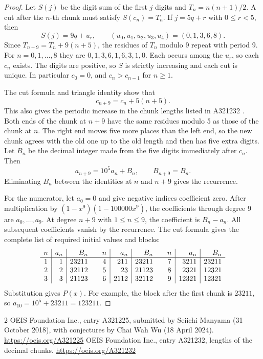 \documentclass[11pt]{article}
\begin{document}
\begin{proof}
Let \(S(j)\) be the digit sum of the first \(j\) digits and \(T_n=n(n+1)/2\). A cut after the \(n\)-th chunk must satisfy \(S(c_n)=T_n\). If \(j=5q+r\) with \(0\le r<5\), then
\[
S(j)=9q+u_r,\qquad (u_0,u_1,u_2,u_3,u_4)=(0,1,3,6,8).
\]
Since \(T_{n+9}=T_n+9(n+5)\), the residues of \(T_n\) modulo 9 repeat with period 9. For \(n=0,1,\ldots,8\) they are \(0,1,3,6,1,6,3,1,0\). Each occurs among the \(u_r\), so each \(c_n\) exists. The digits are positive, so \(S\) is strictly increasing and each cut is unique. In particular \(c_0=0\), and \(c_n>c_{n-1}\) for \(n\ge1\).

The cut formula and triangle identity show that
\[
c_{n+9}=c_n+5(n+5).
\]
This also gives the periodic increase in the chunk lengths listed in A321232 \cite{lengths}. Both ends of the chunk at \(n+9\) have the same residues modulo 5 as those of the chunk at \(n\). The right end moves five more places than the left end, so the new chunk agrees with the old one up to the old length and then has five extra digits. Let \(B_n\) be the decimal integer made from the five digits immediately after \(c_n\). Then
\[
a_{n+9}=10^5a_n+B_n,\qquad B_{n+9}=B_n.
\]
Eliminating \(B_n\) between the identities at \(n\) and \(n+9\) gives the recurrence.

For the numerator, let \(a_0=0\) and give negative indices coefficient zero. After multiplication by \((1-x^9)(1-100000x^9)\), the coefficients through degree 9 are \(a_0,\ldots,a_9\). At degree \(n+9\) with \(1\le n\le9\), the coefficient is \(B_n-a_n\). All subsequent coefficients vanish by the recurrence. The cut formula gives the complete list of required initial values and blocks:
\[
\begin{array}{c|r|r@{\qquad}c|r|r@{\qquad}c|r|r}
n&a_n&B_n&n&a_n&B_n&n&a_n&B_n\\ \hline
1&1&23211&4&211&23211&7&3211&23211\\
2&2&32112&5&23&21123&8&2321&12321\\
3&3&21123&6&2112&32112&9&12321&12321
\end{array}
\]
Substitution gives \(P(x)\). For example, the block after the first chunk is \(23211\), so \(a_{10}=10^5+23211=123211\).
\end{proof}

\begin{thebibliography}{2}
OEIS Foundation Inc., entry A321225, submitted by Seiichi Manyama (31 October 2018), with conjectures by Chai Wah Wu (18 April 2024).
\url{https://oeis.org/A321225}
OEIS Foundation Inc., entry A321232, lengths of the decimal chunks.
\url{https://oeis.org/A321232}
\end{thebibliography}
\end{document}
